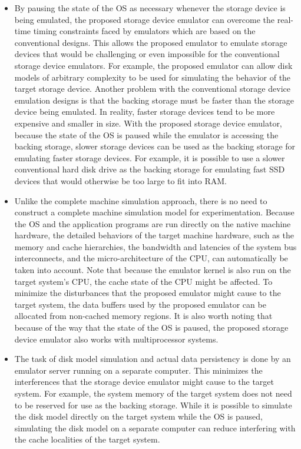 \begin{itemize}
	\item By pausing the state of the OS as necessary whenever the storage device is being emulated, the proposed storage device emulator can overcome the real-time timing constraints faced by emulators which are based on the conventional designs. This allows the proposed emulator to emulate storage devices that would be challenging or even impossible for the conventional storage device emulators. For example, the proposed emulator can allow disk models of arbitrary complexity to be used for simulating the behavior of the target storage device. Another problem with the conventional storage device emulation designs is that the backing storage must be faster than the storage device being emulated. In reality, faster storage devices tend to be more expensive and smaller in size. With the proposed storage device emulator, because the state of the OS is paused while the emulator is accessing the backing storage, slower storage devices can be used as the backing storage for emulating faster storage devices. For example, it is possible to use a slower conventional hard disk drive as the backing storage for emulating fast SSD devices that would otherwise be too large to fit into RAM.
	
	\item Unlike the complete machine simulation approach, there is no need to construct a complete machine simulation model for experimentation. Because the OS and the application programs are run directly on the native machine hardware, the detailed behaviors of the target machine hardware, such as the memory and cache hierarchies, the bandwidth and latencies of the system bus interconnects, and the micro-architecture of the CPU, can automatically be taken into account. Note that because the emulator kernel is also run on the target system's CPU, the cache state of the CPU might be affected. To minimize the disturbances that the proposed emulator might cause to the target system, the data buffers used by the proposed emulator can be allocated from non-cached memory regions. It is also worth noting that because of the way that the state of the OS is paused, the proposed storage device emulator also works with multiprocessor systems.
	
	\item The task of disk model simulation and actual data persistency is done by an emulator server running on a separate computer. This minimizes the interferences that the storage device emulator might cause to the target system. For example, the system memory of the target system does not need to be reserved for use as the backing storage. While it is possible to simulate the disk model directly on the target system while the OS is paused, simulating the disk model on a separate computer can reduce interfering with the cache localities of the target system.
	

\end{itemize}
